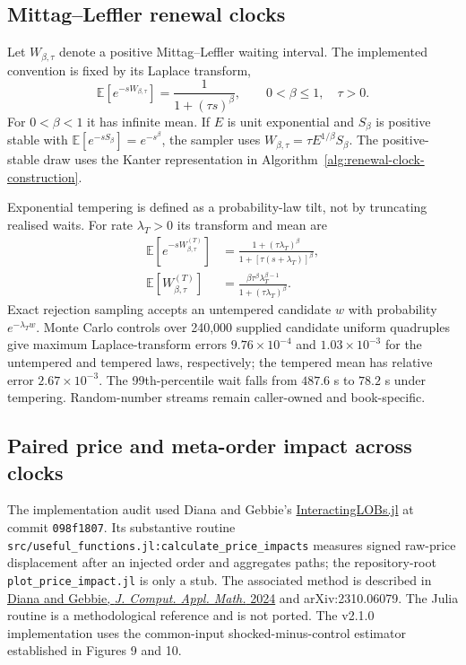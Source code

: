 
\subsection{Mittag--Leffler renewal clocks}
\label{app:mittag-leffler-clocks}

Let $W_{\beta,\tau}$ denote a positive Mittag--Leffler waiting interval.  The
implemented convention is fixed by its Laplace transform,
\begin{equation}
\mathbb E[e^{-sW_{\beta,\tau}}]
=\frac{1}{1+(\tau s)^\beta},
\qquad 0<\beta\leq1,\quad \tau>0.
\label{eq:ml-wait-laplace}
\end{equation}
For $0<\beta<1$ it has infinite mean.  If $E$ is unit exponential and
$S_\beta$ is positive stable with
$\mathbb E[e^{-sS_\beta}]=e^{-s^\beta}$, the sampler uses
$W_{\beta,\tau}=\tau E^{1/\beta}S_\beta$.  The positive-stable draw uses the
Kanter representation in Algorithm~\ref{alg:renewal-clock-construction}.

Exponential tempering is defined as a probability-law tilt, not by truncating
realised waits.  For rate $\lambda_T>0$ its transform and mean are
\begin{align}
\mathbb E[e^{-sW^{(T)}_{\beta,\tau}}]
&=\frac{1+(\tau\lambda_T)^\beta}
{1+[\tau(s+\lambda_T)]^\beta},
\label{eq:tempered-ml-laplace}\\
\mathbb E[W^{(T)}_{\beta,\tau}]
&=\frac{\beta\tau^\beta\lambda_T^{\beta-1}}
{1+(\tau\lambda_T)^\beta}.
\label{eq:tempered-ml-mean}
\end{align}
Exact rejection sampling accepts an untempered candidate $w$ with probability
$e^{-\lambda_Tw}$.  Monte Carlo controls over 240,000 supplied candidate
uniform quadruples give maximum Laplace-transform errors $9.76\times10^{-4}$
and $1.03\times10^{-3}$ for the untempered and tempered laws, respectively;
the tempered mean has relative error $2.67\times10^{-3}$.  The 99th-percentile
wait falls from $487.6$ s to $78.2$ s under tempering.  Random-number streams
remain caller-owned and book-specific.

\subsection{Paired price and meta-order impact across clocks}
\label{app:clock-impact}

The implementation audit used Diana and Gebbie's
\href{https://github.com/DerickDiana/InteractingLOBs.jl}{InteractingLOBs.jl}
at commit \texttt{098f1807}.  Its substantive routine
\texttt{src/useful\_functions.jl:calculate\_price\_impacts} measures signed
raw-price displacement after an injected order and aggregates paths; the
repository-root \texttt{plot\_price\_impact.jl} is only a stub.  The associated
method is described in
\href{https://doi.org/10.1016/j.cam.2024.116202}{Diana and Gebbie,
\emph{J. Comput. Appl. Math.} 2024} and arXiv:2310.06079.  The Julia routine is
a methodological reference and is not ported.  The v2.1.0 implementation uses
the common-input shocked-minus-control estimator established in Figures 9 and
10.


